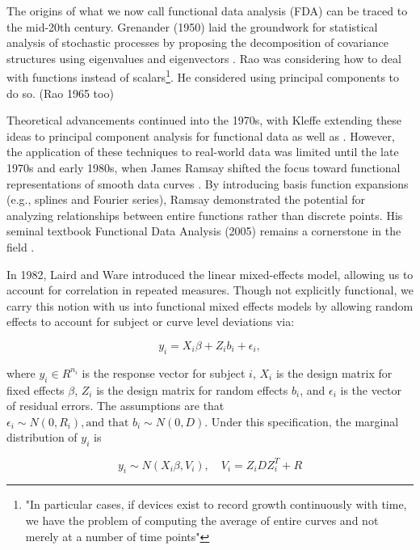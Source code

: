 The origins of what we now call functional data analysis (FDA) can be traced to the mid-20th century. Grenander (1950) laid the groundwork for statistical analysis of stochastic processes by proposing the decomposition of covariance structures using eigenvalues and eigenvectors \cite{ulf_grenander_stochastic_1950}.  
Rao was considering how to deal with functions instead of scalars\footnote{"In particular cases, if devices exist to record growth continuously with time, we have the problem of computing the average of entire curves and not merely at a number of time points"}.  
He considered using principal components to do so\cite{rao_statistical_1958}.  (Rao 1965 too)

Theoretical advancements continued into the 1970s, with Kleffe extending these ideas to principal component analysis for functional data as well as \cite{kleffe_principal_1973}. 
However, the application of these techniques to real-world data was limited until the late 1970s and early 1980s, when James Ramsay shifted the focus toward functional representations of smooth data curves \cite{ramsay_when_1982}. 
By introducing basis function expansions (e.g., splines and Fourier series), Ramsay demonstrated the potential for analyzing relationships between entire functions rather than discrete points. 
His seminal textbook Functional Data Analysis (2005) remains a cornerstone in the field \cite{ramsay_functional_2005}.

In 1982, Laird and Ware introduced the linear mixed-effects model, allowing us to account for correlation in repeated measures\cite{laird_random-effects_1982}.  
Though not explicitly functional, we carry this notion with us into functional mixed effects models by allowing random effects to account for subject or curve level deviations via:

\begin{equation}
\label{fda:lmm}
    y_i = X_i \beta + Z_i b_i + \epsilon_i,
\end{equation}

where \(y_i \in R^{n_i}\) is the response vector for subject \(i\), \(X_i\) is the design matrix for fixed effects \(\beta\), \(Z_i\) is the design matrix for random effects \(b_i\), and \(\epsilon_i\) is the vector of residual errors. 
The assumptions are that \(\epsilon_i \sim N(0, R_i), \text{and that } b_i \sim N(0, D)\).  
Under this specification, the marginal distribution of $y_i$ is

\begin{equation}
    y_i \sim N(X_i \beta, V_i), \quad V_i = Z_i D Z_i^T + R
\end{equation}

